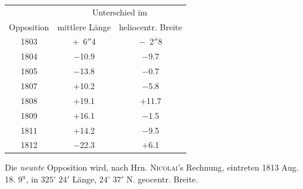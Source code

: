 \begin{center}
\fontsize{10}{12}\selectfont\setlength{\tabcolsep}{7pt}\renewcommand{\arraystretch}{1.15}\begin{tabular}{c|c|c}
 & \multicolumn{2}{c}{Unterschied im} \\
Opposition & mittlere Länge & heliocentr. Breite \\
\hline
1803 & $+$\ 6$''$4  & $-$\ 2$''$8 \\
1804 & $-$10.9 & $-$9.7 \\
1805 & $-$13.8 & $-$0.7 \\
1807 & $+$10.2 & $-$5.8 \\
1808 & $+$19.1 & $+$11.7 \\
1809 & $+$16.1 & $-$1.5 \\
1811 & $+$14.2 & $-$9.5 \\
1812 & $-$22.3 & $+$6.1 \\
\end{tabular}
\end{center}

\par\indent Die \emph{neunte} Opposition wird, nach Hrn. \textsc{Nicolai}'s Rechnung, eintreten
1813 Aug. 18. $9^{\mathrm u}$, in $325^\circ\;24'$ Länge, $24^\circ\;37'$
N. geocentr. Breite.
